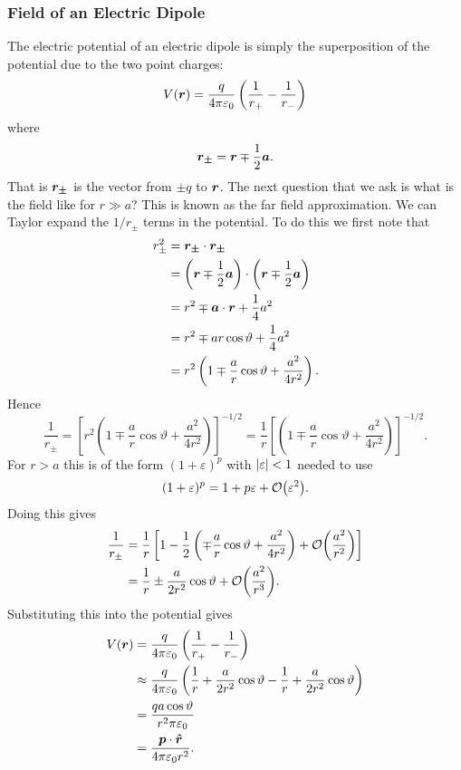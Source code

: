     \subsubsection{Field of an Electric Dipole}
    The electric potential of an electric dipole is simply the superposition of the potential due to the two point charges:
    \[V(\bm{r}) = \frac{q}{4\pi\varepsilon_0}\left(\frac{1}{r_+} - \frac{1}{r_-}\right)\]
    where 
    \[\bm{r_{\pm}} = \bm{r} \mp \frac{1}{2}\bm{a}.\]
    That is \(\bm{r_\pm}\) is the vector from \(\pm q\) to \(\bm{r}\).
    The next question that we ask is what is the field like for \(r \gg a\)?
    This is known as the far field approximation.
    We can Taylor expand the \(1/r_\pm\) terms in the potential.
    To do this we first note that
    \begin{align*}
        r_\pm^2 &= \bm{r_\pm}\cdot\bm{r_\pm}\\
        &= \left(\bm{r} \mp \frac{1}{2}\bm{a}\right)\cdot\left(\bm{r} \mp \frac{1}{2}\bm{a}\right)\\
        &= r^2 \mp \bm{a}\cdot\bm{r} + \frac{1}{4}a^2\\
        &= r^2 \mp  ar\cos\vartheta + \frac{1}{4}a^2\\
        &= r^2\left(1 \mp \frac{a}{r}\cos\vartheta + \frac{a^2}{4r^2}\right).
    \end{align*}
    Hence
    \[\frac{1}{r_\pm} = \left[r^2\left(1 \mp \frac{a}{r}\cos\vartheta + \frac{a^2}{4r^2}\right)\right]^{-1/2} = \frac{1}{r}\left[\left(1 \mp \frac{a}{r}\cos\vartheta + \frac{a^2}{4r^2}\right)\right]^{-1/2}.\]
    For \(r > a\) this is of the form \((1 + \varepsilon)^p\) with \(\abs{\varepsilon} < 1\) needed to use
    \[(1 + \varepsilon)^p = 1 + p\varepsilon + \order{\varepsilon^2}.\]
    Doing this gives
    \begin{align*}
        \frac{1}{r_\pm} &= \frac{1}{r}\left[1 - \frac{1}{2}\left(\mp\frac{a}{r}\cos\vartheta + \frac{a^2}{4r^2}\right) + \order{\frac{a^2}{r^2}}\right]\\
        &= \frac{1}{r} \pm \frac{a}{2r^2}\cos\vartheta + \order{\frac{a^2}{r^3}}.
    \end{align*}
    Substituting this into the potential gives
    \begin{align*}
        V(\bm{r}) &= \frac{q}{4\pi\varepsilon_0}\left(\frac{1}{r_+} - \frac{1}{r_-}\right)\\
        &\approx \frac{q}{4\pi\varepsilon_0}\left(\frac{1}{r} + \frac{a}{2r^2}\cos\vartheta - \frac{1}{r} + \frac{a}{2r^2}\cos\vartheta\right)\\
        &= \frac{qa\cos\vartheta}{r^2\pi\varepsilon_0}\\
        &= \frac{\bm{p}\cdot\bm{\hat{r}}}{4\pi\varepsilon_0r^2}.
    \end{align*}
